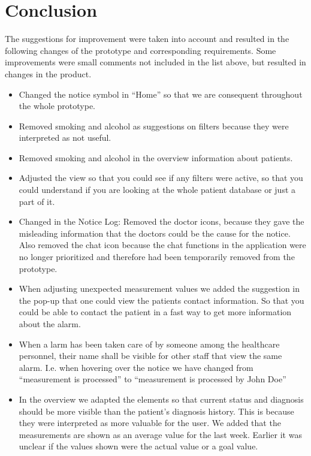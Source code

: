 \documentclass{article}
\begin{document}
	\section{Conclusion}
	
	The suggestions for improvement were taken into account and resulted in the following changes of the prototype and corresponding requirements. Some improvements were small comments not included in the list above, but resulted in changes in the product.
	
	\begin{itemize}
		\item Changed the notice symbol in “Home” so that we are consequent throughout the whole prototype.
		
		\item Removed smoking and alcohol as suggestions on filters because they were interpreted as not useful.
		
		\item Removed smoking and alcohol in the overview information about patients.
		
		\item Adjusted the view so that you could see if any filters were active, so that you could understand if you are looking at the whole patient database or just a part of it.
		
		\item Changed in the Notice Log: Removed the doctor icons, because they gave the misleading information that the doctors could be the cause for the notice. Also removed the chat icon because the chat functions in the application were no longer prioritized and therefore had been temporarily removed from the prototype.    
		
		\item When adjusting unexpected measurement values we added the suggestion in the pop-up that one could view the patients contact information. So that you could be able to contact the patient in a fast way to get more information about the alarm. 
		
		\item When a larm has been taken care of by someone among the healthcare personnel, their name shall be visible for other staff that view the same alarm. I.e. when hovering over the notice we have changed from “measurement is processed” to “measurement is processed by John Doe”
		
		\item In the overview we adapted the elements so that current status and diagnosis should be more visible than the patient's diagnosis history. This is because they were interpreted as more valuable for the user. We added that the measurements are shown as an average value for the last week. Earlier it was unclear if the values shown were the actual value or a goal value.
		

\end{itemize}
\end{document}

